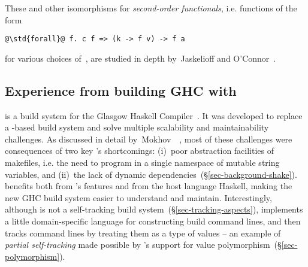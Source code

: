 These and other isomorphisms for \emph{second-order functionals}, i.e.
functions of the form

\vspace{1mm}
\begin{center}
\begin{minipage}{0.5\textwidth}
\begin{verbatim}
@\std{forall}@ f. c f => (k -> f v) -> f a
\end{verbatim}
\end{minipage}
\end{center}
\vspace{1mm}

for various choices of~, are studied in depth by~Jaskelioff and
O’Connor~.

\subsection{Experience from building GHC with \Shake}

\Hadrian is a build system for the Glasgow Haskell Compiler~\cite{ghc}. It was
developed to replace a \Make-based build system and solve multiple scalability
and maintainability challenges. As discussed in detail
by~Mokhov~\etal~, most of these challenges were consequences
of two key \Make's shortcomings: (i)~poor abstraction facilities of makefiles,
i.e. the need to program in a single namespace of mutable string variables, and
(ii)~the lack of dynamic dependencies~(\S\ref{sec-background-shake}).
\Hadrian benefits both from \Shake's features and from the host language
Haskell, making the new GHC build system easier to understand and maintain.
Interestingly, although \Shake is not a self-tracking build
system~(\S\ref{sec-tracking-aspects}), \Hadrian implements a little
domain-specific language for constructing build command lines, and then tracks
command lines by treating them as a type of values -- an example of
\emph{partial self-tracking} made possible by \Shake's support for value
polymorphism~(\S\ref{sec-polymorphism}).

